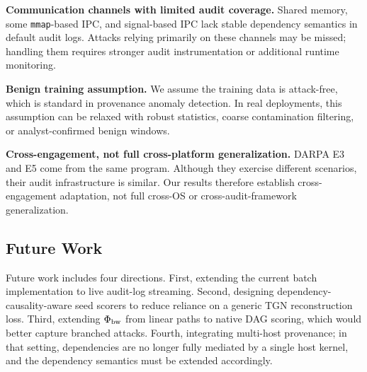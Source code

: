 \textbf{Communication channels with limited audit coverage.} Shared memory, some \texttt{mmap}-based IPC, and signal-based IPC lack stable dependency semantics in default audit logs. Attacks relying primarily on these channels may be missed; handling them requires stronger audit instrumentation or additional runtime monitoring.

\textbf{Benign training assumption.} We assume the training data is attack-free, which is standard in provenance anomaly detection. In real deployments, this assumption can be relaxed with robust statistics, coarse contamination filtering, or analyst-confirmed benign windows.

\textbf{Cross-engagement, not full cross-platform generalization.} DARPA E3 and E5 come from the same program. Although they exercise different scenarios, their audit infrastructure is similar. Our results therefore establish cross-engagement adaptation, not full cross-OS or cross-audit-framework generalization.

\subsection{Future Work}

Future work includes four directions. First, extending the current batch implementation to live audit-log streaming. Second, designing dependency-causality-aware seed scorers to reduce reliance on a generic TGN reconstruction loss. Third, extending $\Phi_{\text{bw}}$ from linear paths to native DAG scoring, which would better capture branched attacks. Fourth, integrating multi-host provenance; in that setting, dependencies are no longer fully mediated by a single host kernel, and the dependency semantics must be extended accordingly.
